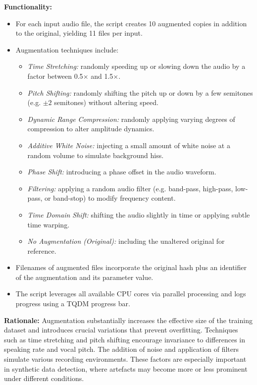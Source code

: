 \documentclass[conference]{IEEEtran}  %
\begin{document}
\textbf{Functionality:}
\begin{itemize}
    \item For each input audio file, the script creates 10 augmented copies in addition to the original, yielding 11 files per input.
    \item Augmentation techniques include:
    \begin{itemize}
        \item \emph{Time Stretching:} randomly speeding up or slowing down the audio by a factor between 0.5\(\times\) and 1.5\(\times\).
        \item \emph{Pitch Shifting:} randomly shifting the pitch up or down by a few semitones (e.g. \(\pm2\) semitones) without altering speed.
        \item \emph{Dynamic Range Compression:} randomly applying varying degrees of compression to alter amplitude dynamics.
        \item \emph{Additive White Noise:} injecting a small amount of white noise at a random volume to simulate background hiss.
        \item \emph{Phase Shift:} introducing a phase offset in the audio waveform.
        \item \emph{Filtering:} applying a random audio filter (e.g. band-pass, high-pass, low-pass, or band-stop) to modify frequency content.
        \item \emph{Time Domain Shift:} shifting the audio slightly in time or applying subtle time warping.
        \item \emph{No Augmentation (Original):} including the unaltered original for reference.
    \end{itemize}
    \item Filenames of augmented files incorporate the original hash plus an identifier of the augmentation and its parameter value.
    \item The script leverages all available CPU cores via parallel processing and logs progress using a TQDM progress bar.
\end{itemize}

\textbf{Rationale:} Augmentation substantially increases the effective size of the training dataset and introduces crucial variations that prevent overfitting. Techniques such as time stretching and pitch shifting encourage invariance to differences in speaking rate and vocal pitch. The addition of noise and application of filters simulate various recording environments. These factors are especially important in synthetic data detection, where artefacts may become more or less prominent under different conditions.
\end{document}
